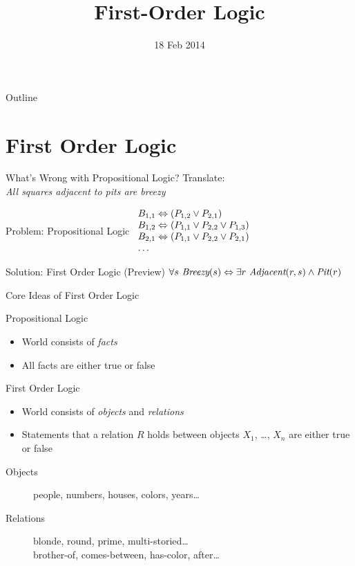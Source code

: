 \documentclass[14pt]{beamer}
\title{First-Order Logic}
\date{18 Feb 2014}
\begin{document}
\begin{frame}
	\titlepage
\end{frame}
\begin{frame}{Outline}
	\tableofcontents
\end{frame}

\section{First Order Logic}
\begin{frame}{What's Wrong with Propositional Logic?}
	Translate: \\
	\tab\emph{All squares adjacent to pits are breezy}
	\pause
	\begin{block}{Problem: Propositional Logic}
		$
		\begin{array}{l}
		B_{1,1} \Leftrightarrow (P_{1,2} \lor P_{2,1}) \\
		B_{1,2} \Leftrightarrow (P_{1,1} \lor P_{2,2} \lor P_{1,3}) \\
		B_{2,1} \Leftrightarrow (P_{1,1} \lor P_{2,2} \lor P_{2,1}) \\
		\ldots
		\end{array}
		$
	\end{block}
	\pause
	\begin{block}{Solution: First Order Logic (Preview)}
		$\forall s\ \textit{Breezy}(s) \liff \exists r\ \textit{Adjacent}(r, s) \land \textit{Pit}(r)$
	\end{block}
\end{frame}
\begin{frame}{Core Ideas of First Order Logic}
	\begin{block}{Propositional Logic}
		\begin{itemize}
			\item World consists of \emph{facts}
			\item All facts are either true or false
		\end{itemize}
	\end{block}
	\pause
	\begin{block}{First Order Logic}
		\begin{itemize}
			\item World consists of \emph{objects} and \emph{relations}
			\item Statements that a relation $R$ holds between objects $X_1$, \ldots, $X_n$ are either true or false
		\end{itemize}
		\pause
		\begin{description}
			\item[Objects] people, numbers, houses, colors, years\ldots
			\item[Relations]
				blonde, round, prime, multi-storied\ldots \\
			  brother-of, comes-between, has-color, after\ldots
		\end{description}
	\end{block}
\end{frame}
\end{document}
